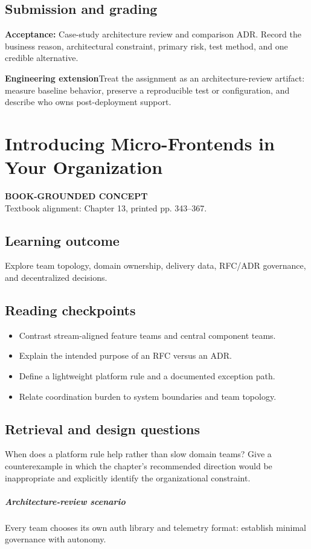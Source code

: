 \documentclass[11pt,letterpaper,oneside]{report}
\newcommand{\based}[1]{\begin{sourcebox}\textbf{BOOK-GROUNDED CONCEPT}\\#1\end{sourcebox}}
\newcommand{\criterion}[1]{\textbf{Acceptance:} #1}
\begin{document}
\section{Submission and grading}
\criterion{Case-study architecture review and comparison ADR. Record the business reason, architectural constraint, primary risk, test method, and one credible alternative.}
\begin{engineerbox}\textbf{Engineering extension}\newline Treat the assignment as an architecture-review artifact: measure baseline behavior, preserve a reproducible test or configuration, and describe who owns post-deployment support.\end{engineerbox}

\chapter{Introducing Micro-Frontends in Your Organization}
\based{Textbook alignment: Chapter 13, printed pp. 343--367.}
\section{Learning outcome}
Explore team topology, domain ownership, delivery data, RFC/ADR governance, and decentralized decisions.
\section{Reading checkpoints}
\begin{itemize}\item Contrast stream-aligned feature teams and central component teams.
\item Explain the intended purpose of an RFC versus an ADR.
\item Define a lightweight platform rule and a documented exception path.
\item Relate coordination burden to system boundaries and team topology.
\end{itemize}
\section{Retrieval and design questions}
When does a platform rule help rather than slow domain teams? Give a counterexample in which the chapter's recommended direction would be inappropriate and explicitly identify the organizational constraint.
\paragraph{Architecture-review scenario} Every team chooses its own auth library and telemetry format: establish minimal governance with autonomy.
\end{document}
